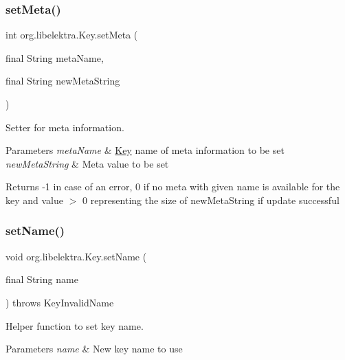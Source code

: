 \subsubsection{\texorpdfstring{set\+Meta()}{setMeta()}}
{\footnotesize\ttfamily int org.\+libelektra.\+Key.\+set\+Meta (\begin{DoxyParamCaption}\item[{final String}]{meta\+Name,  }\item[{final String}]{new\+Meta\+String }\end{DoxyParamCaption})\hspace{0.3cm}{\ttfamily [inline]}}



Setter for meta information. 


\begin{DoxyParams}{Parameters}
{\em meta\+Name} & \hyperlink{classorg_1_1libelektra_1_1Key}{Key} name of meta information to be set \\
\hline
{\em new\+Meta\+String} & Meta value to be set \\
\hline
\end{DoxyParams}
\begin{DoxyReturn}{Returns}
-\/1 in case of an error, 0 if no meta with given name is available for the key and value $>$ 0 representing the size of new\+Meta\+String if update successful 
\end{DoxyReturn}
\mbox{\label{classorg_1_1libelektra_1_1Key_abd5602765701a10b6a10887c09810cf5}} 
\subsubsection{\texorpdfstring{set\+Name()}{setName()}}
{\footnotesize\ttfamily void org.\+libelektra.\+Key.\+set\+Name (\begin{DoxyParamCaption}\item[{final String}]{name }\end{DoxyParamCaption}) throws Key\+Invalid\+Name\hspace{0.3cm}{\ttfamily [inline]}}



Helper function to set key name. 


\begin{DoxyParams}{Parameters}
{\em name} & New key name to use \\
\hline
\end{DoxyParams}

